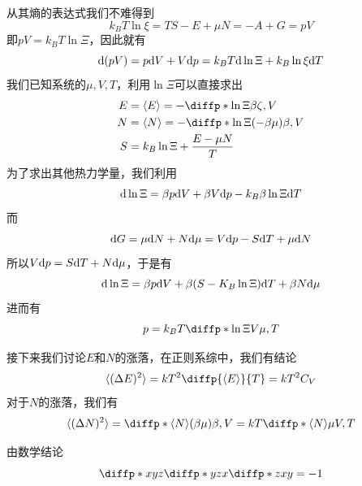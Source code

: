 从其熵的表达式我们不难得到\begin{equation}
       k_B T\ln \xi =TS -E+\mu N=-A+G =pV
\end{equation}
即$pV=k_BT \ln \Xi$，因此就有\begin{equation}
       \mathrm{d} (pV)=p\mathrm{d} V+V\mathrm{d} p=k_B T \mathrm{d} \ln \Xi+k_B\ln \xi \mathrm{d} T
\end{equation}
我们已知系统的$\mu,V,T$，利用$\ln \Xi$可以直接求出\begin{align}
       E&=\braket{E}=-\diffp*{\ln \Xi}{\beta}{\zeta, V}\\
       N&=\braket{N}=-\diffp*{\ln \Xi}{{(-\beta\mu)}}{\beta,V}\\
       S&=k_B \ln \Xi +\frac{E-\mu N}{T}\\
\end{align}
为了求出其他热力学量，我们利用\begin{equation}
       \mathrm{d} \ln \Xi =\beta p \mathrm{d} V+\beta V\mathrm{d} p -k_B \beta \ln \Xi \mathrm{d} T 
\end{equation}
而\begin{equation}
       \mathrm{d} G=\mu \mathrm{d} N+N\mathrm{d} \mu=V\mathrm{d} p -S\mathrm{d} T +\mu \mathrm{d} N
\end{equation}
所以$V\mathrm{d} p =S\mathrm{d} T +N\mathrm{d} \mu $，于是有\begin{equation}
       \mathrm{d} \ln \Xi =\beta p \mathrm{d} V+\beta (S-K_B \ln \Xi)\mathrm{d} T +\beta N \mathrm{d} \mu
\end{equation}
进而有\begin{equation}
       p=k_B T \diffp*{\ln \Xi}{V}{\mu,T}
\end{equation}

接下来我们讨论$E$和$N$的涨落，在正则系综中，我们有结论\begin{equation}
       \braket{(\Delta E)^2}=kT^2 \diffp{\braket{E}}{T}=kT^2 C_V
\end{equation}
对于$N$的涨落，我们有\begin{equation}
       \braket{(\Delta N)^2}=\diffp*{\braket{N}}{{(\beta\mu)}}{\beta,V}=kT \diffp*{\braket{N}}{\mu}{V,T}
\end{equation}

由数学结论\begin{equation}
       \diffp*{x}{y}{z} \diffp*{y}{z}{x}\diffp*{z}{x}{y}=-1
\end{equation}

